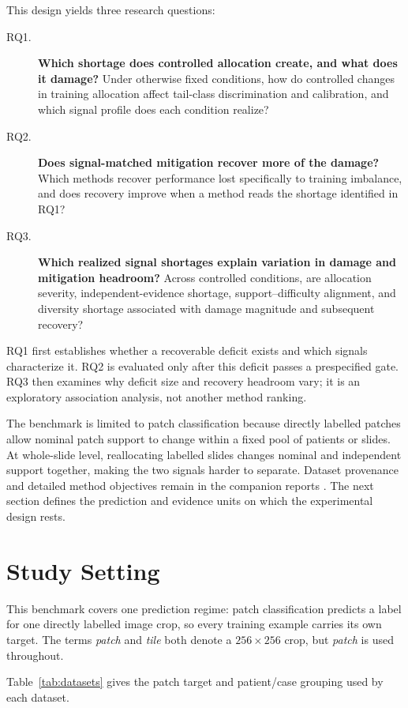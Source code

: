 \documentclass[11pt]{article}
\begin{document}
This design yields three research questions:
\begin{description}
  \item[RQ1.] \textbf{Which shortage does controlled allocation create, and what does it damage?} Under otherwise fixed conditions, how do controlled changes in training allocation affect tail-class discrimination and calibration, and which signal profile does each condition realize?
  \item[RQ2.] \textbf{Does signal-matched mitigation recover more of the damage?} Which methods recover performance lost specifically to training imbalance, and does recovery improve when a method reads the shortage identified in RQ1?
  \item[RQ3.] \textbf{Which realized signal shortages explain variation in damage and mitigation headroom?} Across controlled conditions, are allocation severity, independent-evidence shortage, support--difficulty alignment, and diversity shortage associated with damage magnitude and subsequent recovery?
\end{description}
RQ1 first establishes whether a recoverable deficit exists and which signals characterize it. RQ2 is evaluated only after this deficit passes a prespecified gate. RQ3 then examines why deficit size and recovery headroom vary; it is an exploratory association analysis, not another method ranking.

The benchmark is limited to patch classification because directly labelled patches allow nominal patch support to change within a fixed pool of patients or slides. At whole-slide level, reallocating labelled slides changes nominal and independent support together, making the two signals harder to separate. Dataset provenance and detailed method objectives remain in the companion reports \citep{queisler2026datasets,queisler2026imbalanceMethods}. The next section defines the prediction and evidence units on which the experimental design rests.

\section{Study Setting}
\label{sec:data}
This benchmark covers one prediction regime: patch classification predicts a label for one directly labelled image crop, so every training example carries its own target. The terms \emph{patch} and \emph{tile} both denote a $256\times256$ crop, but \emph{patch} is used throughout.

Table~\ref{tab:datasets} gives the patch target and patient/case grouping used by each dataset.
\end{document}
